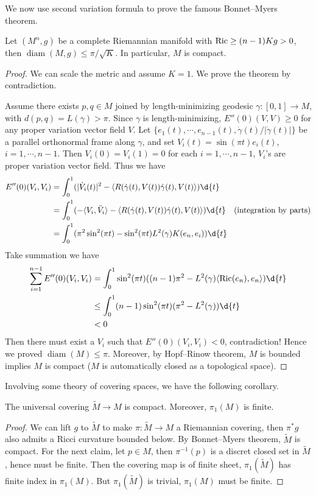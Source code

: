 We now use second variation formula to prove the famous Bonnet--Myers theorem.
\begin{thm}
    Let $(M^n,g)$ be a complete Riemannian manifold with $\operatorname{Ric}\geq(n-1)Kg>0$,
    then $\operatorname{diam}(M,g)\leq\pi/\sqrt{K}$.
    In particular, $M$ is compact.
\end{thm}
\begin{proof}
    We can scale the metric and assume $K=1$.
    We prove the theorem by contradiction.

    Assume there exists $p,q\in M$ joined by length-minimizing geodesic $\gamma:[0,1]\to M$, with $d(p,q)=L(\gamma)>\pi$.
    Since $\gamma$ is length-minimizing, $E''(0)(V,V)\geq 0$ for any proper variation vector field $V$.
    Let $\{e_1(t),\cdots,e_{n-1}(t),\dot{\gamma}(t)/|\dot{\gamma}(t)|\}$ be a parallel orthonormal frame along $\gamma$, and set $V_i(t)=\sin(\pi t)e_i(t)$, $i=1,\cdots,n-1$.
    Then $V_i(0)=V_i(1)=0$ for each $i=1,\cdots,n-1$, $V_i$'s are proper variation vector field.
    Thus we have
    \begin{align*}
        E''(0)(V_i,V_i)&=\int_0^1(|\dot{V}_i(t)|^2-\langle R(\dot{\gamma}(t),V(t))\dot{\gamma}(t),V(t)\rangle)\d{t}\\
        &=\int_0^1(-\langle V_i,\ddot{V}_i\rangle-\langle R(\dot{\gamma}(t),V(t))\dot{\gamma}(t),V(t)\rangle)\d{t}\quad\text{(integration by parts)}\\
        &=\int_0^1(\pi^2\sin^2(\pi t)-\sin^2(\pi t)L^2(\gamma)K(e_n,e_i))\d{t}
    \end{align*}
    Take summation we have
    \begin{align*}
        \sum_{i=1}^{n-1}E''(0)(V_i,V_i)&=\int_0^1\sin^2(\pi t)((n-1)\pi^2-L^2(\gamma)\langle\Ric(e_n),e_n\rangle)\d{t}\\
        &\leq\int_0^1(n-1)\sin^2(\pi t)(\pi^2-L^2(\gamma))\d{t}\\
        &<0
    \end{align*}
    Then there must exist a $V_i$ such that $E''(0)(V_i,V_i)<0$, contradiction!
    Hence we proved $\operatorname{diam}(M)\leq\pi$.
    Moreover, by Hopf--Rinow theorem, $M$ is bounded implies $M$ is compact ($M$ is automatically closed as a topological space).
\end{proof}

Involving some theory of covering spaces, we have the following corollary.
\begin{cor}
    The universal covering $\tilde{M}\to M$ is compact.
    Moreover, $\pi_1(M)$ is finite.
\end{cor}
\begin{proof}
    We can lift $g$ to $\tilde{M}$ to make $\pi:\tilde{M}\to M$ a Riemannian covering, then $\pi^*g$ also admits a Ricci curvature bounded below.
    By Bonnet--Myers theorem, $\tilde{M}$ is compact.
    For the next claim, let $p\in M$, then $\pi^{-1}(p)$ is a discret closed set in $\tilde{M}$, hence must be finite.
    Then the covering map is of finite sheet, $\pi_1(\tilde{M})$ has finite index in $\pi_1(M)$.
    But $\pi_1(\tilde{M})$ is trivial, $\pi_1(M)$ must be finite.
\end{proof}

